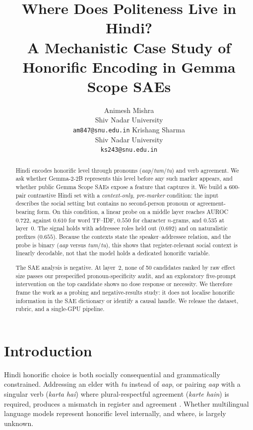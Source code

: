 \documentclass[11pt]{article}
\title{Where Does Politeness Live in Hindi?\\
A Mechanistic Case Study of Honorific Encoding in Gemma Scope SAEs}
\author{Animesh Mishra \\
  Shiv Nadar University \\
  \texttt{am847@snu.edu.in}
  \And
  Krishang Sharma \\
  Shiv Nadar University \\
  \texttt{ks243@snu.edu.in}}
\date{}
\newcommand{\aap}{\textit{aap}}
\newcommand{\tum}{\textit{tum}}
\newcommand{\tu}{\textit{tu}}
\begin{document}
\maketitle

\begin{abstract}
Hindi encodes honorific level through pronouns (\aap{}/\tum{}/\tu{}) and verb
agreement. We ask whether Gemma-2-2B represents this level before any such
marker appears, and whether public Gemma Scope SAEs expose a feature that
captures it. We build a 600-pair contrastive Hindi set with a
\emph{context-only, pre-marker} condition: the input describes the social
setting but contains no second-person pronoun or agreement-bearing form. On this
condition, a linear probe on a middle layer reaches AUROC $0.722$, against
$0.610$ for word TF--IDF, $0.550$ for character $n$-grams, and $0.535$ at
layer~0. The signal holds with addressee roles held out ($0.692$) and on
naturalistic prefixes ($0.655$). Because the contexts state the
speaker--addressee relation, and the probe is binary (\aap{} versus
\tum{}/\tu{}), this shows that register-relevant social context is linearly
decodable, not that the model holds a dedicated honorific variable.

The SAE analysis is negative. At layer~2, none of 50 candidates ranked by raw
effect size passes our prespecified pronoun-specificity audit, and an
exploratory five-prompt intervention on the top candidate shows no dose response
or necessity. We therefore frame the work as a probing and negative-results
study: it does not localise honorific information in the SAE dictionary or
identify a causal handle. We release the dataset, rubric, and a single-GPU
pipeline.
\end{abstract}

\section{Introduction}
\label{sec:intro}

Hindi honorific choice is both socially consequential and grammatically
constrained. Addressing an elder with \tu{} instead of \aap{}, or pairing \aap{}
with a singular verb (\textit{karta hai}) where plural-respectful agreement
(\textit{karte hain}) is required, produces a mismatch in register and
agreement \citep{kachru2006hindi}. Whether multilingual language models
represent honorific level internally, and where, is largely unknown.
\end{document}
